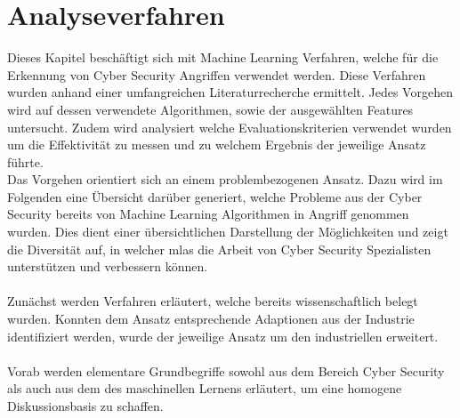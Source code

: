 \documentclass[
    12pt, %
    DIV10,
    ngerman, %
    a4paper, %
    oneside, %
    titlepage, %
    parskip=half, %
    headings=normal, %
    listof=totoc, %
    bibliography=totoc, %
    index=totoc, %
    captions=tableheading, %
    final %
]{scrreprt}
\begin{document}
\chapter{Analyseverfahren}\label{sec:analyse}
\label{sec:ba}
Dieses Kapitel beschäftigt sich mit Machine Learning Verfahren, welche für die Erkennung von Cyber Security Angriffen verwendet werden. Diese Verfahren wurden anhand einer umfangreichen Literaturrecherche ermittelt. Jedes Vorgehen wird auf dessen verwendete Algorithmen, sowie der ausgewählten Features untersucht. Zudem wird analysiert welche Evaluationskriterien verwendet wurden um die Effektivität zu messen und zu welchem Ergebnis der jeweilige Ansatz führte.\\
Das Vorgehen orientiert sich an einem problembezogenen Ansatz. Dazu wird im Folgenden eine Übersicht darüber generiert, welche Probleme aus der Cyber Security bereits von Machine Learning Algorithmen in Angriff genommen wurden. Dies dient einer übersichtlichen Darstellung der Möglichkeiten und zeigt die Diversität auf, in welcher \ac{mlas} die Arbeit von Cyber Security Spezialisten unterstützen und verbessern können.\\\\
Zunächst werden Verfahren erläutert, welche bereits wissenschaftlich belegt wurden. Konnten dem Ansatz entsprechende Adaptionen aus der Industrie identifiziert werden, wurde der jeweilige Ansatz um den industriellen erweitert.
\\\\
Vorab werden elementare Grundbegriffe sowohl aus dem Bereich Cyber Security als auch aus dem des maschinellen Lernens erläutert, um eine homogene Diskussionsbasis zu schaffen.
\end{document}
